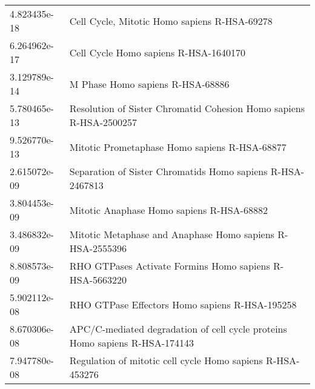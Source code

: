 \begin{longtable}{p{2.4cm}p{14.5cm}}
\bottomrule
\endlastfoot
             4.823435e-18 &                                                                                                           Cell Cycle, Mitotic Homo sapiens R-HSA-69278 \\
             6.264962e-17 &                                                                                                                  Cell Cycle Homo sapiens R-HSA-1640170 \\
             3.129789e-14 &                                                                                                                       M Phase Homo sapiens R-HSA-68886 \\
             5.780465e-13 &                                                                                     Resolution of Sister Chromatid Cohesion Homo sapiens R-HSA-2500257 \\
             9.526770e-13 &                                                                                                          Mitotic Prometaphase Homo sapiens R-HSA-68877 \\
             2.615072e-09 &                                                                                             Separation of Sister Chromatids Homo sapiens R-HSA-2467813 \\
             3.804453e-09 &                                                                                                              Mitotic Anaphase Homo sapiens R-HSA-68882 \\
             3.486832e-09 &                                                                                              Mitotic Metaphase and Anaphase Homo sapiens R-HSA-2555396 \\
             8.808573e-09 &                                                                                                RHO GTPases Activate Formins Homo sapiens R-HSA-5663220 \\
             5.902112e-08 &                                                                                                         RHO GTPase Effectors Homo sapiens R-HSA-195258 \\
             8.670306e-08 &                                                                            APC/C-mediated degradation of cell cycle proteins Homo sapiens R-HSA-174143 \\
             7.947780e-08 &                                                                                             Regulation of mitotic cell cycle Homo sapiens R-HSA-453276 \\

\end{longtable}
